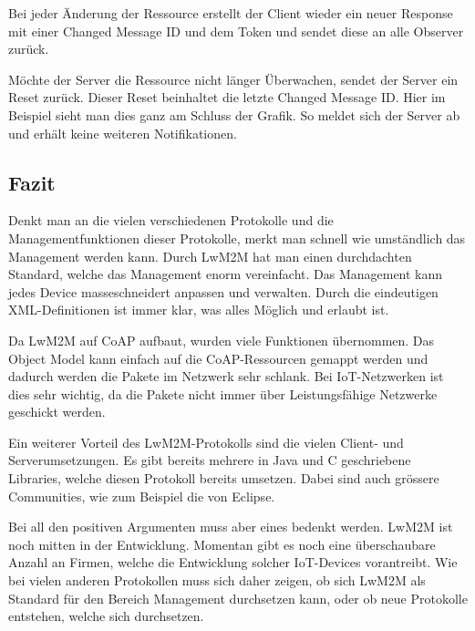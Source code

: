 Bei jeder Änderung der Ressource erstellt der Client wieder ein neuer Response mit einer Changed Message ID und dem Token und sendet diese an alle Observer zurück.

Möchte der Server die Ressource nicht länger Überwachen, sendet der Server ein Reset zurück. Dieser Reset beinhaltet die letzte Changed Message ID. Hier im Beispiel sieht man dies ganz am Schluss der Grafik. So meldet sich der Server ab und erhält keine weiteren Notifikationen.

\subsection{Fazit}
Denkt man an die vielen verschiedenen Protokolle und die Managementfunktionen dieser Protokolle, merkt man schnell wie umständlich das Management werden kann. Durch LwM2M hat man einen durchdachten Standard, welche das Management enorm vereinfacht. Das Management kann jedes Device masseschneidert anpassen und verwalten. Durch die eindeutigen XML-Definitionen ist immer klar, was alles Möglich und erlaubt ist.

Da LwM2M auf CoAP aufbaut, wurden viele Funktionen übernommen. Das Object Model kann einfach auf die CoAP-Ressourcen gemappt werden und dadurch werden die Pakete im Netzwerk sehr schlank.  Bei IoT-Netzwerken ist dies sehr wichtig, da die Pakete nicht immer über Leistungsfähige Netzwerke geschickt werden.

Ein weiterer Vorteil des LwM2M-Protokolls sind die vielen Client- und Serverumsetzungen. Es gibt bereits mehrere in Java und C geschriebene Libraries, welche diesen Protokoll bereits umsetzen. Dabei sind auch grössere Communities, wie zum Beispiel die von Eclipse.

Bei all den positiven Argumenten muss aber eines bedenkt werden. LwM2M ist noch mitten in der Entwicklung. Momentan gibt es noch eine überschaubare Anzahl an Firmen, welche die Entwicklung solcher IoT-Devices vorantreibt. Wie bei vielen anderen Protokollen muss sich daher zeigen, ob sich LwM2M als Standard für den Bereich Management durchsetzen kann, oder ob neue Protokolle entstehen, welche sich durchsetzen.
